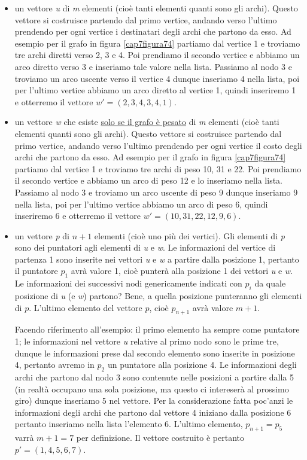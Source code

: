 \documentclass[11pt]{book}
\begin{document}
\begin{itemize}

\item un vettore {\em u} di {\em m} elementi (cio\`e tanti elementi
  quanti sono gli archi). Questo vettore si costruisce partendo dal
  primo vertice, andando verso l'ultimo prendendo per ogni vertice i
  destinatari degli archi che partono da esso. Ad esempio per il grafo
  in figura \ref{cap7figura74} partiamo dal vertice 1 e troviamo tre
  archi diretti verso 2, 3 e 4. Poi prendiamo il secondo vertice e
  abbiamo un arco diretto verso 3 e inseriamo tale valore nella
  lista. Passiamo al nodo 3 e troviamo un arco uscente verso il
  vertice 4 dunque inseriamo 4 nella lista, poi per l'ultimo vertice
  abbiamo un arco diretto al vertice 1, quindi inseriremo 1 e otterremo il
  vettore $w' = (2, 3, 4, 3, 4, 1)$.

\item un vettore {\em w} che esiste \underline{solo se il grafo \`e
  pesato} di {\em m} elementi (cio\`e tanti elementi quanti sono gli
  archi). Questo vettore si costruisce partendo dal primo vertice,
  andando verso l'ultimo prendendo per ogni vertice il costo degli
  archi che partono da esso. Ad esempio per il grafo in figura
  \ref{cap7figura74} partiamo dal vertice 1 e troviamo tre archi di
  peso 10, 31 e 22. Poi prendiamo il secondo vertice e abbiamo un arco
  di peso 12 e lo inseriamo nella lista. Passiamo al nodo 3 e troviamo
  un arco uscente di peso 9 dunque inseriamo 9 nella lista, poi per
  l'ultimo vertice abbiamo un arco di peso 6, quindi inseriremo 6 e
  otterremo il vettore $w' = (10, 31, 22, 12, 9, 6)$.
  
\item un vettore {\em p} di $n+1$ elementi (cio\`e uno pi\`u dei
  vertici).  Gli elementi di {\em p} sono dei puntatori agli elementi
  di {\em u} e {\em w}. Le informazioni del vertice di partenza 1 sono
  inserite nei vettori {\em u} e {\em w} a partire dalla posizione 1,
  pertanto il puntatore $p_1$ avr\`a valore 1, cio\`e punter\`a alla
  posizione 1 dei vettori {\em u} e {\em w}. Le informazioni dei
  successivi nodi genericamente indicati con $p_i$ da quale posizione
  di {\em u} (e {\em w}) partono? Bene, a quella posizione punteranno
  gli elementi di $p$. L'ultimo elemento del vettore $p$, cio\`e
  $p_{n+1}$ avr\`a valore $m+1$.

  Facendo riferimento all'esempio: il primo elemento ha sempre come
  puntatore 1; le informazioni nel vettore {\em u} relative al primo
  nodo sono le prime tre, dunque le informazioni prese dal secondo
  elemento sono inserite in posizione 4, pertanto avremo in $p_2$ un
  puntatore alla posizione 4. Le informazioni degli archi che partono
  dal nodo 3 sono contenute nelle posizioni a partire dalla 5 (in
  realt\`a occupano una sola posizione, ma questo ci intereser\`a al
  prossimo giro) dunque inseriamo 5 nel vettore. Per la considerazione
  fatta poc'anzi le informazioni degli archi che partono dal vettore 4
  iniziano dalla posizione 6 pertanto inseriamo nella lista l'elemento
  6. L'ultimo elemento, $p_{n+1} = p_{5}$ varr\`a $m+1 = 7$ per
  definizione. Il vettore costruito \`e pertanto $p' = (1,4,5,6,7)$.


\end{itemize}
\end{document}
